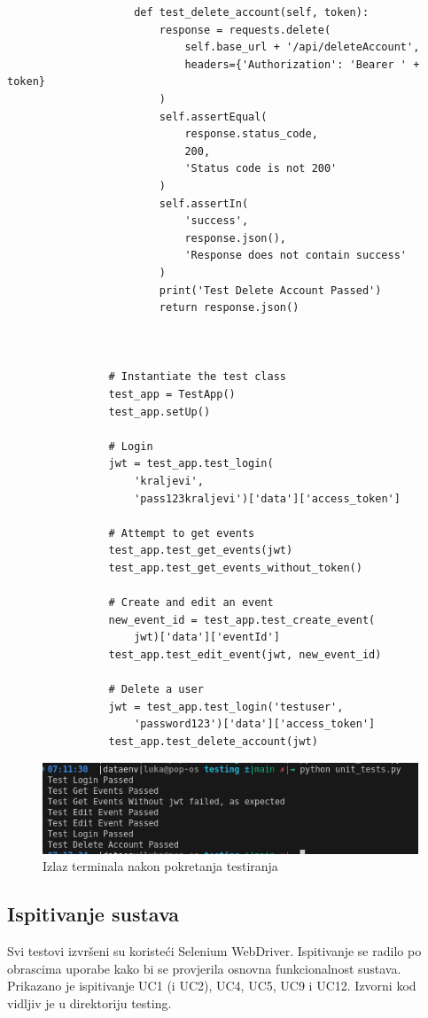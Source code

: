\begin{verbatim}
					def test_delete_account(self, token):
						response = requests.delete(
							self.base_url + '/api/deleteAccount', 
							headers={'Authorization': 'Bearer ' + token}
						)
						self.assertEqual(
							response.status_code, 
							200, 
							'Status code is not 200'
						)
						self.assertIn(
							'success', 
							response.json(), 
							'Response does not contain success'
						)
						print('Test Delete Account Passed')
						return response.json()
					
					

				# Instantiate the test class
				test_app = TestApp()
				test_app.setUp()

				# Login
				jwt = test_app.test_login(
					'kraljevi', 
					'pass123kraljevi')['data']['access_token']

				# Attempt to get events
				test_app.test_get_events(jwt)
				test_app.test_get_events_without_token()

				# Create and edit an event
				new_event_id = test_app.test_create_event(
					jwt)['data']['eventId']
				test_app.test_edit_event(jwt, new_event_id)

				# Delete a user
				jwt = test_app.test_login('testuser', 
					'password123')['data']['access_token']
				test_app.test_delete_account(jwt)
			\end{verbatim}			
			\begin{figure}[htbp]
				\centering
				\includegraphics[width=1\textwidth]{slike/unit_test.png}
				\caption{Izlaz terminala nakon pokretanja testiranja}
			\label{fig:my_image}
			\end{figure}
			
			\subsection{Ispitivanje sustava}
			Svi testovi izvršeni su koristeći Selenium WebDriver. Ispitivanje se radilo po obrascima uporabe kako bi se provjerila osnovna funkcionalnost sustava. Prikazano je ispitivanje UC1 (i UC2), UC4, UC5, UC9 i UC12. Izvorni kod vidljiv je u direktoriju testing.
			
